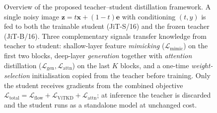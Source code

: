 \begin{figure}[ht]
{\begin{tikzpicture}[node distance=3.5mm]
\end{tikzpicture}
    }
    \caption[Overview of the proposed quality-boosting distillation framework.]{%
    Overview of the proposed teacher--student distillation framework. A single
    noisy image $\bm{z}=t\bm{x}+(1-t)\bm{e}$ with conditioning $(t,y)$ is fed to
    both the trainable student (JiT-S/16) and the frozen teacher (JiT-B/16). Three
    complementary signals transfer knowledge from teacher to student: shallow-layer
    feature \emph{mimicking} ($\mathcal{L}_{\mathrm{mimic}}$) on the first two blocks,
    deep-layer \emph{generation} together with \emph{attention} distillation
    ($\mathcal{L}_{\mathrm{gen}},\mathcal{L}_{\mathrm{attn}}$) on the last $K$ blocks,
    and a one-time \emph{weight-selection} initialisation copied from the teacher
    before training. Only the student receives gradients from the combined objective
    $\mathcal{L}_{\mathrm{total}}=\mathcal{L}_{\mathrm{flow}}+\mathcal{L}_{\mathrm{ViTKD}}
    +\mathcal{L}_{\mathrm{attn}}$; at inference the teacher is discarded and the student
    runs as a standalone model at unchanged cost.}
    \label{fig:framework_overview}
\end{figure}